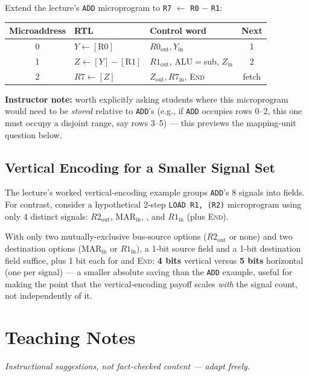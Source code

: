 \documentclass[11pt]{article}
\begin{document}
Extend the lecture's \texttt{ADD} microprogram to \texttt{R7} $\gets$ \texttt{R0} $-$ \texttt{R1}:
\begin{center}
\small
\begin{tabular}{@{}cllc@{}}
\toprule
\textbf{Microaddress} & \textbf{RTL} & \textbf{Control word} & \textbf{Next} \\
\midrule
0 & $Y \gets [\text{R0}]$ & $R0_{\text{out}}, Y_{\text{in}}$ & 1 \\
1 & $Z \gets [Y] - [\text{R1}]$ & $R1_{\text{out}}$, ALU$=$sub, $Z_{\text{in}}$ & 2 \\
2 & $R7 \gets [Z]$ & $Z_{\text{out}}, R7_{\text{in}}$, \textsc{End} & fetch \\
\bottomrule
\end{tabular}
\end{center}
\textbf{Instructor note:} worth explicitly asking students where this microprogram would need to be \emph{stored} relative to \texttt{ADD}'s (e.g., if \texttt{ADD} occupies rows 0--2, this one must occupy a disjoint range, say rows 3--5) --- this previews the mapping-unit question below.

\subsection{Vertical Encoding for a Smaller Signal Set}

The lecture's worked vertical-encoding example groups \texttt{ADD}'s 8 signals into fields. For contrast, consider a hypothetical 2-step \texttt{LOAD R1, (R2)} microprogram using only 4 distinct signals: $R2_{\text{out}}$, $\text{MAR}_{\text{in}}$, , and $R1_{\text{in}}$ (plus \textsc{End}).

With only two mutually-exclusive bus-source options ($R2_{\text{out}}$ or none) and two destination options ($\text{MAR}_{\text{in}}$ or $R1_{\text{in}}$), a 1-bit source field and a 1-bit destination field suffice, plus 1 bit each for  and \textsc{End}: \textbf{4 bits} vertical versus \textbf{5 bits} horizontal (one per signal) --- a smaller absolute saving than the \texttt{ADD} example, useful for making the point that the vertical-encoding payoff scales \emph{with} the signal count, not independently of it.

\section{Teaching Notes}

\textit{Instructional suggestions, not fact-checked content --- adapt freely.}
\end{document}
